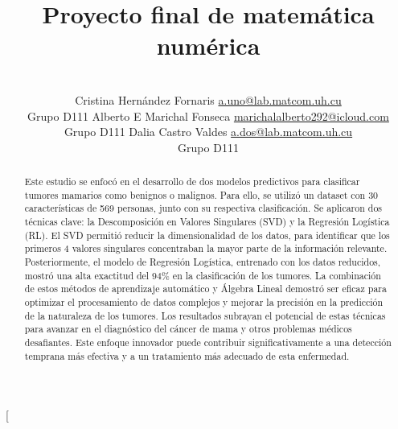 \documentclass[a4paper,10pt,twocolumn]{article}
\title{Proyecto final de matemática numérica}
\author{\\
\name Cristina Hernández Fornaris \email \href{mailto:a.uno@lab.matcom.uh.cu}{a.uno@lab.matcom.uh.cu}
	\\ \addr Grupo D111 \AND
\name Alberto E Marichal Fonseca \email \href{mailto:a.dos@lab.matcom.uh.cu}{marichalalberto292@icloud.com}
  \\ \addr Grupo D111\AND
\name Dalia Castro Valdes \email \href{mailto:a.dos@lab.matcom.uh.cu}{a.dos@lab.matcom.uh.cu}
  \\ \addr Grupo D111}
\begin{document}
\twocolumn[

\maketitle


\begin{abstract}

	Este estudio se enfocó en el desarrollo de dos modelos predictivos para clasificar tumores mamarios como benignos o malignos. Para ello, se utilizó un dataset con 30 características de 569 personas, junto con su respectiva clasificación. Se aplicaron dos técnicas clave: la Descomposición en Valores Singulares (SVD) y la Regresión Logística (RL). El SVD permitió reducir la dimensionalidad de los datos, para identificar que los primeros 4 valores singulares concentraban la mayor parte de la información relevante. Posteriormente, el modelo de Regresión Logística, entrenado con los datos reducidos, mostró una alta exactitud del 94\% en la clasificación de los tumores. La combinación de estos métodos de aprendizaje automático y Álgebra Lineal demostró ser eficaz para optimizar el procesamiento de datos complejos y mejorar la precisión en la predicción de la naturaleza de los tumores. Los resultados subrayan el potencial de estas técnicas para avanzar en el diagnóstico del cáncer de mama y otros problemas médicos desafiantes. Este enfoque innovador puede contribuir significativamente a una detección temprana más efectiva y a un tratamiento más adecuado de esta enfermedad.

\end{abstract}

\vspace{0.5cm}
\end{document}
